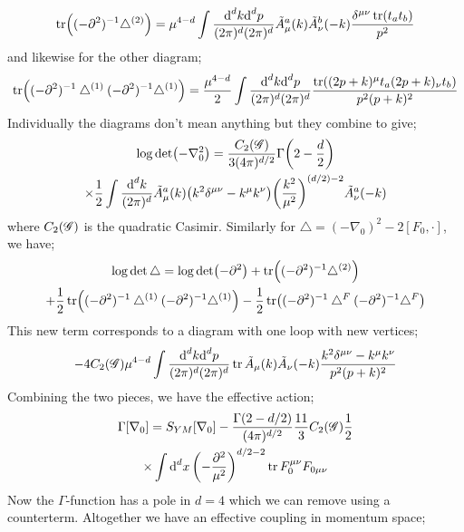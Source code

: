 \begin{equation*}
\tr\left((-\del^2)^{-1}\bigtriangleup^{(2)}\right) = \mu^{4 - d}\int{\frac{\ud^d k \ud^d p}{(2\pi)^d (2\pi)^d}\tilde{A}_\mu^a(k)\tilde{A}_\nu^b(-k)\frac{\delta^{\mu\nu}\tr(t_a t_b)}{p^2}}
\end{equation*}
and likewise for the other diagram;
\begin{equation*}
\tr\left((-\del^2)^{-1}\bigtriangleup^{(1)}(-\del^2)^{-1}\bigtriangleup^{(1)}\right) = \frac{\mu^{4 - d}}{2}\int{\frac{\ud^d k \ud^d p}{(2\pi)^d (2\pi)^d}\frac{\tr\left((2p + k)^{\mu}t_a(2p + k)_\nu t_b\right)}{p^2 (p + k)^2}}
\end{equation*}
Individually the diagrams don't mean anything but they combine to give;
\begin{multline*}
\log \det\left(-\nabla_0^2\right) = \frac{C_2(\group)}{3(4\pi)^{d/2}}\Gamma\left(2 - \frac{d}{2}\right) \\ \times\frac{1}{2}\int{\frac{\ud^d k}{(2\pi)^d}\tilde{A}^a_\mu(k)\left(k^2 \delta^{\mu\nu} - k^{\mu}k^{\nu}\right)\left(\frac{k^2}{\mu^2}\right)^{(d/2) - 2}\tilde{A}_\nu^a(-k)}
\end{multline*}
where $C_2(\mathscr{G})$ is the quadratic Casimir. Similarly for $\bigtriangleup = (-\nabla_0)^2 - 2[F_0, \cdot]$, we have;
\begin{multline*}
\log\det\bigtriangleup = \log \det (-\del^2) + \tr\left((-\del^2)^{-1}\bigtriangleup^{(2)}\right) \\ + \frac{1}{2}\tr\left((-\del^2)^{-1}\bigtriangleup^{(1)}(-\del^2)^{-1}\bigtriangleup^{(1)}\right) - \frac{1}{2}\tr\left((-\del^2)^{-1}\bigtriangleup^{F}(-\del^2)^{-1}\bigtriangleup^{F}\right)
\end{multline*}
This new term corresponds to a diagram with one loop with new vertices;
\begin{equation*}
-4 C_2(\mathscr{G}) \mu^{4 - d}\int{\frac{\text{d}^d k \text{d}^d p}{(2\pi)^d (2\pi)^d}\tr \tilde{A}_\mu(k)\tilde{A}_\nu(-k)\frac{k^2 \delta^{\mu\nu} - k^{\mu}k^{\nu}}{p^2(p + k)^2}}
\end{equation*}
Combining the two pieces, we have the effective action;
\begin{multline}
\Gamma[\nabla_0] = S_{YM}[\nabla_0] - \frac{\Gamma(2 - d/2)}{(4\pi)^{d/2}}\frac{11}{3}C_2(\group)\frac{1}{2} \\ \times \int{\upd{^d x}\left(-\frac{\del^2}{\mu^2}\right)^{d/2 - 2}\tr F_0^{\mu\nu}F_{0 \mu\nu}}
\end{multline}
Now the $\Gamma$-function has a pole in $d = 4$ which we can remove using a counterterm. Altogether we have an effective coupling in momentum space;
